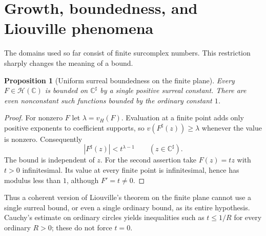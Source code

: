 \documentclass[11pt,letterpaper]{article}
\newtheorem{proposition}[theorem]{Proposition}
\theoremstyle{definition}
\theoremstyle{remark}
\newcommand{\C}{\mathbb C}
\newcommand{\HH}{\mathcal H}
\newcommand{\sh}{^{\sharp}}
\numberwithin{equation}{section}
\begin{document}
\section{Growth, boundedness, and Liouville phenomena}\label{sec:growth}
The domains used so far consist of finite surcomplex numbers. This restriction sharply changes the meaning of a bound.

\begin{proposition}[Uniform surreal boundedness on the finite plane]\label{prop:autobounded}
Every $F\in\HH(\C)$ is bounded on $\C\sh$ by a single positive surreal constant. There are even nonconstant such functions bounded by the ordinary constant $1$.
\end{proposition}
\begin{proof}
For nonzero $F$ let $\lambda=v_H(F)$. Evaluation at a finite point adds only positive exponents to coefficient supports, so $v(F\sh(z))\ge\lambda$ whenever the value is nonzero. Consequently
\[
 |F\sh(z)|<t^{\lambda-1}\qquad(z\in\C\sh).
\]
The bound is independent of $z$. For the second assertion take $F(z)=tz$ with $t>0$ infinitesimal. Its value at every finite point is infinitesimal, hence has modulus less than $1$, although $F'=t\ne0$.
\end{proof}
Thus a coherent version of Liouville's theorem on the finite plane cannot use a single surreal bound, or even a single ordinary bound, as its entire hypothesis. Cauchy's estimate on ordinary circles yields inequalities such as $t\le1/R$ for every ordinary $R>0$; these do not force $t=0$.
\end{document}
